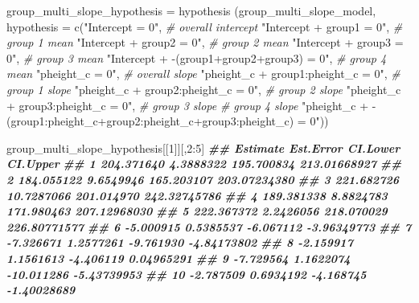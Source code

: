 \documentclass[
]{book}
\newenvironment{Shaded}{\begin{snugshade}}{\end{snugshade}}
\newcommand{\AttributeTok}[1]{\textcolor[rgb]{0.77,0.63,0.00}{#1}}
\newcommand{\CommentTok}[1]{\textcolor[rgb]{0.56,0.35,0.01}{\textit{#1}}}
\newcommand{\DecValTok}[1]{\textcolor[rgb]{0.00,0.00,0.81}{#1}}
\newcommand{\DocumentationTok}[1]{\textcolor[rgb]{0.56,0.35,0.01}{\textbf{\textit{#1}}}}
\newcommand{\FunctionTok}[1]{\textcolor[rgb]{0.00,0.00,0.00}{#1}}
\newcommand{\NormalTok}[1]{#1}
\newcommand{\OtherTok}[1]{\textcolor[rgb]{0.56,0.35,0.01}{#1}}
\newcommand{\SpecialCharTok}[1]{\textcolor[rgb]{0.00,0.00,0.00}{#1}}
\newcommand{\StringTok}[1]{\textcolor[rgb]{0.31,0.60,0.02}{#1}}
\begin{document}
\begin{Shaded}
\begin{Highlighting}[]
\NormalTok{group\_multi\_slope\_hypothesis }\OtherTok{=} 
  \FunctionTok{hypothesis}\NormalTok{ (group\_multi\_slope\_model,}
              \AttributeTok{hypothesis =} 
                \FunctionTok{c}\NormalTok{(}\StringTok{"Intercept = 0"}\NormalTok{, }\CommentTok{\# overall intercept}
                  \StringTok{"Intercept + group1 = 0"}\NormalTok{, }\CommentTok{\# group 1 mean}
                  \StringTok{"Intercept + group2 = 0"}\NormalTok{, }\CommentTok{\# group 2 mean}
                  \StringTok{"Intercept + group3 = 0"}\NormalTok{, }\CommentTok{\# group 3 mean}
                  \StringTok{"Intercept + {-}(group1+group2+group3) = 0"}\NormalTok{, }\CommentTok{\# group 4 mean}
                  \StringTok{"pheight\_c = 0"}\NormalTok{, }\CommentTok{\# overall slope}
                  \StringTok{"pheight\_c + group1:pheight\_c = 0"}\NormalTok{, }\CommentTok{\# group 1 slope}
                  \StringTok{"pheight\_c + group2:pheight\_c = 0"}\NormalTok{, }\CommentTok{\# group 2 slope}
                  \StringTok{"pheight\_c + group3:pheight\_c = 0"}\NormalTok{, }\CommentTok{\# group 3 slope}
                  \CommentTok{\# group 4 slope}
                  \StringTok{"pheight\_c +   }
\StringTok{                  {-}(group1:pheight\_c+group2:pheight\_c+group3:pheight\_c) = 0"}\NormalTok{))}
\end{Highlighting}
\end{Shaded}

\begin{Shaded}
\begin{Highlighting}[]
\NormalTok{group\_multi\_slope\_hypothesis[[}\DecValTok{1}\NormalTok{]][,}\DecValTok{2}\SpecialCharTok{:}\DecValTok{5}\NormalTok{]}
\DocumentationTok{\#\#      Estimate  Est.Error   CI.Lower     CI.Upper}
\DocumentationTok{\#\# 1  204.371640  4.3888322 195.700834 213.01668927}
\DocumentationTok{\#\# 2  184.055122  9.6549946 165.203107 203.07234380}
\DocumentationTok{\#\# 3  221.682726 10.7287066 201.014970 242.32745786}
\DocumentationTok{\#\# 4  189.381338  8.8824783 171.980463 207.12968030}
\DocumentationTok{\#\# 5  222.367372  2.2426056 218.070029 226.80771577}
\DocumentationTok{\#\# 6   {-}5.000915  0.5385537  {-}6.067112  {-}3.96349773}
\DocumentationTok{\#\# 7   {-}7.326671  1.2577261  {-}9.761930  {-}4.84173802}
\DocumentationTok{\#\# 8   {-}2.159917  1.1561613  {-}4.406119   0.04965291}
\DocumentationTok{\#\# 9   {-}7.729564  1.1622074 {-}10.011286  {-}5.43739953}
\DocumentationTok{\#\# 10  {-}2.787509  0.6934192  {-}4.168745  {-}1.40028689}
\end{Highlighting}
\end{Shaded}
\end{document}
